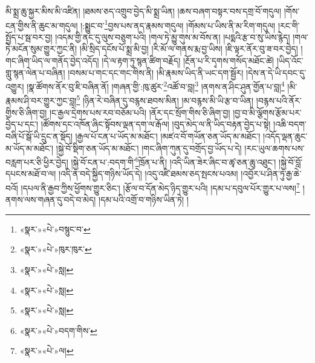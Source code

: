 མི་སྨྲ་ཆུ་སྐྱར་མིས་མི་འཛིན། །ཐམས་ཅད་འགྲུབ་བྱེད་མི་སྨྲ་ཡིན། །ཆས་བཞག་བསྟར་བས་དགྲ་བོ་གདུལ། །གོས་ངན་གྱིས་ནི་ཆུང་མ་གདུལ། །:སྨྱུང་བ་\footnote{«སྣར་»«པེ་»བསྙུང་བ་}བྱས་པས་ནད་རྣམས་གདུལ། །གོམས་པ་ཡིས་ནི་མ་རིག་གདུལ། །རང་གི་སྤྱོད་པ་སྦ་བར་བྱ། །འདམ་གྱི་ནང་དུ་ལུས་བཅུག་པའི། །གལ་ཏེ་མྱུ་གུས་མ་བོས་ན། །པདྨའི་རྩ་བ་སུ་ཡིས་རྙེད། །གལ་ཏེ་མངོན་སུམ་གྱུར་ཀྱང་ནི། །མི་སྲིད་དངོས་པོ་སྨྲ་མི་བྱ། །རི་མོ་ལ་གནས་རྨ་བྱ་ཡིས། །ཇི་ལྟར་ནོར་བུ་ཟ་བར་བྱེད། །གང་ཞིག་ཡིད་ལ་གནོད་བྱེད་འདོད། །དེ་ལ་རྟག་ཏུ་སྙན་ཚིག་བརྗོད། །རྔོན་པ་རི་དྭགས་གསོད་མཐོང་ཚེ། །ཡིད་འོང་གླུ་སྙན་ལེན་པ་བཞིན། །བསམ་པ་གང་དང་གང་གིས་ནི། །མི་རྣམས་ཡིད་ནི་ཡང་དག་སྦྱོར། །དེས་ན་དེ་ཡི་དབང་དུ་འགྱུར། །སྣ་ཚོགས་ནོར་བུ་ཇི་བཞིན་ནོ། །གཞན་གྱི་:ཁུ་ཚུར་\footnote{«སྣར་»«པེ་»ཁུར་ཁུར་}འཚོ་བ་བླ།\footnote{«སྣར་»«པེ་»སླ།} །ནགས་ན་ཤིང་ཤུན་གྱོན་པ་བླ།\footnote{«སྣར་»«པེ་»སླ།} །མི་རྣམས་ཤི་བར་གྱུར་ཀྱང་བླ།\footnote{«སྣར་»«པེ་»སླ།} །ཉིན་རེ་བཞིན་དུ་བརྙས་ཐབས་མིན། །མ་བརྙས་མི་ཡི་རྩ་བ་ཡིན། །བརྙས་པའི་ནོར་གྱིས་ཅི་ཞིག་བྱ། །ང་རྒྱལ་དྲེགས་པས་རབ་བཅོམ་པའི། །ནོར་དང་སྲོག་གིས་ཅི་ཞིག་བྱ། །བྱ་བ་མི་ལྕོགས་རྩོམ་པར་བྱེད་པ་དང་། །ཚོགས་དང་འཁོན་ཞིང་སྟོབས་ལྡན་དག་ལ་རྒོལ། །བུད་མེད་ལ་ནི་ཡིད་བརྟན་བྱེད་པ་སྟེ། །འཆི་བདག་བཞི་པོ་སྒོ་ཡི་དྲུང་ན་སྡོད། །རྒྱལ་པོ་ངན་པ་ཡོད་མ་མཐོང་། །མཛའ་བོ་གཡོན་ཅན་ཡོད་མ་མཐོང་། །འདོད་ལྡན་ཆུང་མ་ཡོད་མ་མཐོང་། །སྐྱེ་བོ་སྡིག་ཅན་ཡོད་མ་མཐོང་། །གང་ཞིག་ཀུན་དུ་བགྲོད་བྱ་ཡོད་པ་དེ། །རང་ཡུལ་ཆགས་པས་བརླག་པར་ཅི་ཕྱིར་བྱེད། །སྐྱེ་བོ་ངན་པ་:བདག་གི་\footnote{«སྣར་»«པེ་»བདག་གིས་}ཁྲོན་པ་ནི། །འདི་ཡིན་ཟེར་ཞིང་བ་ཚྭ་ཅན་ཆུ་འཐུང་། །སྐྱེ་བོ་བློ་དཔངས་མཐོ་བ་ལ། །འདི་ན་བདེ་སྐྱིད་གཉིས་ཡོད་དེ། །འདུ་འཛི་ཐམས་ཅད་སྤངས་པའམ། །འབྱོར་པ་ཤིན་ཏུ་རྒྱ་ཆེ་བའོ། །དཔལ་ནི་རྒྱབ་ཀྱིས་ཕྱོགས་གྱུར་ཅིང་། །རྩོལ་བ་དོན་མེད་ཉིད་གྱུར་པའི། །དམ་པ་དབུལ་པོར་གྱུར་པ་ལས།\footnote{«སྣར་»«པེ་»ལ།} །ནགས་ལས་གཞན་དུ་བདེ་བ་མེད། །དམ་པའི་འགྲོ་བ་གཉིས་ཡིན་ཏེ། །
